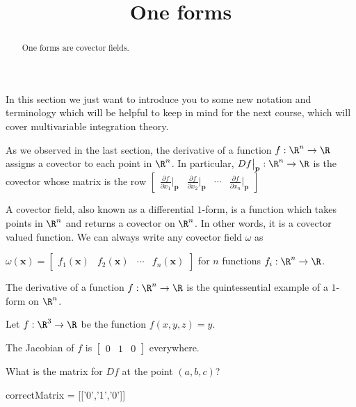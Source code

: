 \documentclass{ximera}
\title{One forms}
\begin{document}
	\begin{abstract}
		One forms are covector fields.
	\end{abstract}\maketitle
	
	In this section we just want to introduce you to some new notation and terminology which will be helpful to keep in mind for the next course, which
	will cover multivariable integration theory.
	
	As we observed in the last section, the derivative of  a function $f:\R^n \to \R$ assigns a covector to each point in $\R^n$.  In particular,
	$Df\big|_{\mathbf{p}} : \R^n \to \R$ is the covector whose matrix is the row 
	\(\begin{bmatrix} \frac{\partial f}{\partial x_1}\big|_{\mathbf{p}} & \frac{\partial f}{\partial x_2}\big|_{\mathbf{p}} & \cdots & \frac{\partial f}{\partial x_n}\big|_{\mathbf{p}}\end{bmatrix}\)
	
	\begin{definition}
		A covector field, also known as a differential $1$-form, is a function which takes points in $\R^n$ and returns a covector on $\R^n$.  In other words, it is a covector
		valued function.  We can always write any covector field $\omega$ as
		
		$\omega(\mathbf{x}) = \begin{bmatrix} f_1(\mathbf{x}) &  f_2(\mathbf{x}) & \cdots &  f_n(\mathbf{x})  \end{bmatrix}$ for $n$ functions $f_i:\R^n \to \R$.
	\end{definition}
	
	The derivative of a function $f:\R^n \to \R$ is the quintessential example of a $1$-form on $\R^n$.
	
	\begin{question}
		Let $f:\R^3 \to \R$ be the function $f(x,y,z)= y$. 
		\begin{solution}
		\begin{hint}
			The Jacobian of $f$ is  $\begin{bmatrix} 0&1&0 \end{bmatrix}$ everywhere.
		\end{hint}
		 What is the matrix for $Df$ at the point $(a,b,c)$?
		 	\begin{matrix-answer}
		 		correctMatrix = [['0','1','0']]
		 	\end{matrix-answer}
		 \end{solution}
	\end{question}
	
\end{document}
